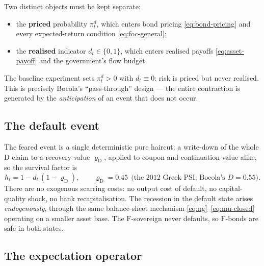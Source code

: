 \documentclass[11pt]{article}
\numberwithin{equation}{section}
\newcommand{\D}{\mathrm{D}}
\newcommand{\F}{\mathrm{F}}
\theoremstyle{definition}
\theoremstyle{plain}
\theoremstyle{remark}
\begin{document}
Two distinct objects must be kept separate:
\begin{itemize}
\item the \textbf{priced} probability $\pi^{d}_t$, which enters bond pricing
      \eqref{eq:bond-pricing} and every expected-return condition
      \eqref{eq:foc-general};
\item the \textbf{realised} indicator $d_t\in\{0,1\}$, which enters realised payoffs
      \eqref{eq:asset-payoff} and the government's flow budget.
\end{itemize}
The baseline experiment sets $\pi^{d}_t>0$ with $d_t\equiv0$: risk is priced but
never realised. This is precisely Bocola's ``pass-through'' design --- the entire
contraction is generated by the \emph{anticipation} of an event that does not occur.

\subsection{The default event}

The feared event is a single deterministic pure haircut: a write-down of the whole
$\D$-claim to a recovery value $\varrho_\D$, applied to coupon and continuation value
alike, so the survival factor is
\begin{equation}
h_t=1-d_t\,(1-\varrho_\D),
\qquad \varrho_\D=0.45 \ \ \text{(the 2012 Greek PSI; Bocola's $D=0.55$)} .
\label{eq:haircut}
\end{equation}
There are no exogenous scarring costs: no output cost of default, no capital-quality
shock, no bank recapitalisation. The recession in the default state arises
\emph{endogenously}, through the same balance-sheet mechanism
\eqref{eq:ng}--\eqref{eq:mu-closed} operating on a smaller asset base. The
$\F$-sovereign never defaults, so $\F$-bonds are safe in both states.

\subsection{The expectation operator}
\end{document}
